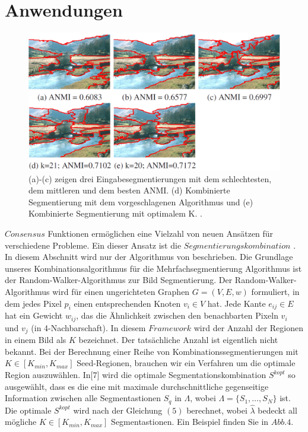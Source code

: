 \documentclass[runningheads]{llncs}
\begin{document}
\section{Anwendungen}
\begin{figure}[t]
	\begin{center}
		\includegraphics[width=\textwidth]{Beispiel}
		\caption{(a)-(c) zeigen drei Eingabesegmentierungen mit
			dem schlechtesten, dem mittleren und dem besten ANMI. (d)
			Kombinierte Segmentierung mit dem vorgeschlagenen Algorithmus und
			(e) Kombinierte Segmentierung mit optimalem K. \cite{wattuya2008random}.}
	\end{center}
\end{figure} 
$Consensus$ Funktionen ermöglichen eine Vielzahl von neuen Ansätzen für
verschiedene Probleme. Ein dieser Ansatz ist die $Segmentierungskombination$ \cite{wattuya2008random}. In diesem Abschnitt wird nur der Algorithmus von \cite{wattuya2008random} beschrieben. Die Grundlage unseres Kombinationsalgorithmus für die Mehrfachsegmentierung
Algorithmus ist der Random-Walker-Algorithmus zur Bild
Segmentierung. Der Random-Walker-Algorithmus wird für einen
ungerichteten Graphen $G = (V, E, w)$ formuliert, in dem jedes Pixel
$p_i$ einen entsprechenden Knoten $v_i \in V$ hat. Jede Kante $e_{ij} \in E$  hat ein Gewicht $w_{ij}$, das die Ähnlichkeit zwischen den benachbarten Pixeln $v_i$ und $v_j$  (in 4-Nachbarschaft). In diesem $Framework$ wird der Anzahl der Regionen in einem Bild als $K$ bezeichnet. Der tatsächliche Anzahl ist eigentlich nicht bekannt. Bei der Berechnung einer Reihe von Kombinationssegmentierungen
mit $K \in [K_{min}, K_{max}]$ Seed-Regionen, brauchen wir ein Verfahren um
die optimale Region auszuwählen. In[7] wird die optimale Segmentationskombination $S^{kopt}$ so ausgewählt, dass es die eine mit maximale durchschnittliche gegenseitige Information zwischen alle Segmentastionen $S_q$ in $\Lambda$, wobei $\Lambda  = \{S_1, \ldots ,S_N\}$ ist. Die optimale $S^{kopt}$ wird nach der Gleichung $(5)$ berechnet, wobei $\hat{\lambda}$ bedeckt all mögliche  $K \in [K_{min}, K_{max}]$  Segmentastionen. Ein Beispiel finden Sie in $Abb.4$.




\printbibliography
\end{document}
